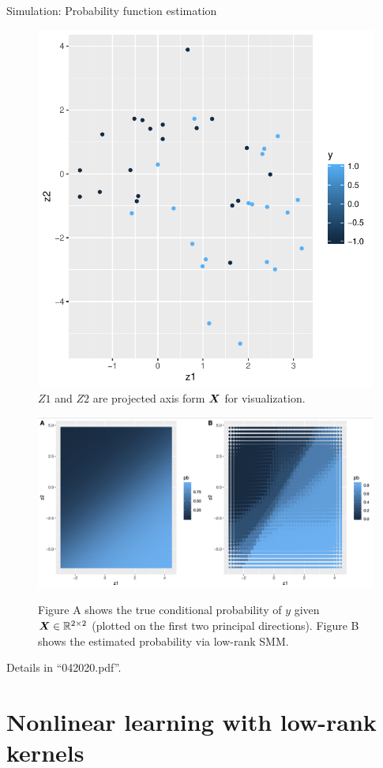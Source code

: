 \documentclass[compress,dvipsnames]{beamer}
\begin{document}
\begin{frame}{Simulation: Probability function estimation}
\begin{figure}[H]
\centering
\includegraphics[width=.2\textwidth]{realization.pdf}
\caption{\scriptsize $Z1$ and $Z2$ are projected axis form $\bm{X}$ for visualization.}
\end{figure}

\vspace{-.5cm}
\begin{figure}
    \centering
    \includegraphics[width = 6 cm]{condpb.png}
    \label{fig:my_label}
    \caption{\scriptsize Figure A shows the true conditional probability of $y$ given $\bm{X}\in\mathbb{R}^{2\times 2}$ (plotted on the first two principal directions). Figure B shows the estimated probability via low-rank SMM. }
\end{figure}
{\scriptsize Details in ``042020.pdf''.}
\end{frame}





\section{Nonlinear learning with low-rank kernels}
\end{document}
